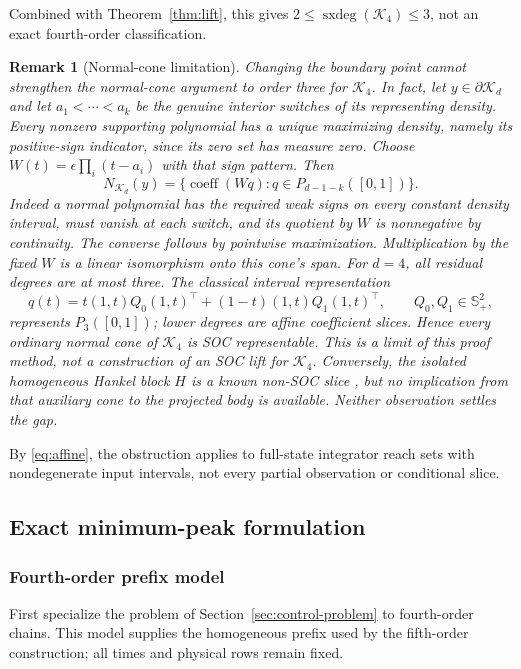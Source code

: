 \documentclass[pdflatex,sn-mathphys-num]{sn-jnl}
\theoremstyle{thmstyleone}
\theoremstyle{thmstyletwo}\newtheorem{remark}[theorem]{Remark}
\newcommand{\K}{\mathcal K}
\newcommand{\PSD}{\mathbb S_+}
\newcommand{\sxdeg}{\operatorname{sxdeg}}
\begin{document}
Combined with Theorem~\ref{thm:lift}, this gives
$2\le\sxdeg(\K_4)\le3$, not an exact fourth-order classification.
\begin{remark}[Normal-cone limitation]\label{rem:normal-limit}
Changing the boundary point cannot strengthen the normal-cone argument to
order three for $\K_4$. In fact, let $y\in\partial\K_d$ and let
$a_1<\cdots<a_k$ be the genuine interior switches of its representing
density. Every nonzero supporting polynomial has a unique maximizing
density, namely its positive-sign indicator, since its zero set has measure
zero. Choose $W(t)=\epsilon\prod_i(t-a_i)$ with that sign pattern. Then
\[
 N_{\K_d}(y)=\{\operatorname{coeff}(Wq):q\in P_{d-1-k}([0,1])\}.
\]
Indeed a normal polynomial has the required weak signs on every constant
density interval, must vanish at each switch, and its quotient by $W$ is
nonnegative by continuity. The converse follows by pointwise maximization.
Multiplication by the fixed $W$ is a linear isomorphism onto this cone's span.
For $d=4$, all residual degrees are at most three. The classical interval
representation
\[
 q(t)=t(1,t)Q_0(1,t)^\top+(1-t)(1,t)Q_1(1,t)^\top,
 \qquad Q_0,Q_1\in\PSD^2,
\]
represents $P_3([0,1])$; lower degrees are affine coefficient slices. Hence
every ordinary normal cone of $\K_4$ is SOC representable. This is a limit
of this proof method, not a construction of an SOC lift for $\K_4$.
Conversely, the isolated homogeneous Hankel block $H$ is a known non-SOC
slice \cite[Theorem 5]{fawzi},
but no implication from that auxiliary cone to the
projected body is available. Neither observation settles the gap.
\end{remark}

By \eqref{eq:affine}, the obstruction applies to full-state integrator
reach sets with nondegenerate input intervals, not every partial observation
or conditional slice.

\subsection{Exact minimum-peak formulation}\label{sec:synthesis}
\subsubsection{Fourth-order prefix model}
First specialize the problem of Section~\ref{sec:control-problem} to
fourth-order chains. This model supplies the homogeneous prefix used by
the fifth-order construction; all times and physical rows remain fixed.
\end{document}

